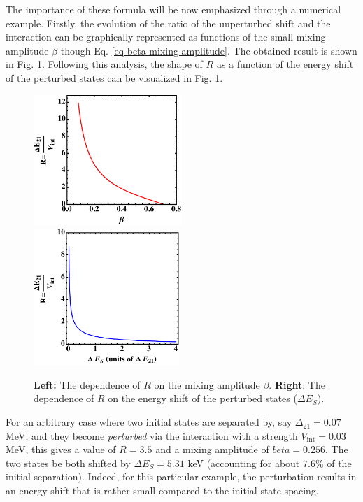 The importance of these formula will be now emphasized through a numerical example. Firstly, the evolution of the ratio of the unperturbed shift and the interaction can be graphically represented as functions of the small mixing amplitude $\beta$ though Eq. \eqref{eq-beta-mixing-amplitude}. The obtained result is shown in Fig. \ref{fig-beta-mixing-amplitude}. Following this analysis, the shape of $R$ as a function of the energy shift of the perturbed states can be visualized in Fig. \ref{fig-beta-mixing-amplitude}.
\begin{figure}
    \centering
    \includegraphics[width=0.5\textwidth]{Chapters/Figures/beta_mixing_amplitude.pdf}
    \includegraphics[width=0.49\textwidth]{Chapters/Figures/energy_shift_mixing_shape.pdf}
    \caption{\textbf{Left:} The dependence of $R$ on the mixing amplitude $\beta$. \textbf{Right}: The dependence of $R$ on the energy shift of the perturbed states ($\Delta E_S$).}
    \label{fig-beta-mixing-amplitude}
\end{figure}

For an arbitrary case where two initial states are separated by, say $\Delta_{21}=0.07$ MeV, and they become \emph{perturbed} via the interaction with a strength $V_\text{int}=0.03$ MeV, this gives a value of $R=3.5$ and a mixing amplitude of $beta=0.256$. The two states be both shifted by $\Delta E_S=5.31$ keV (accounting for about $7.6 \%$ of the initial separation). Indeed, for this particular example, the perturbation results in an energy shift that is rather small compared to the initial state spacing.

